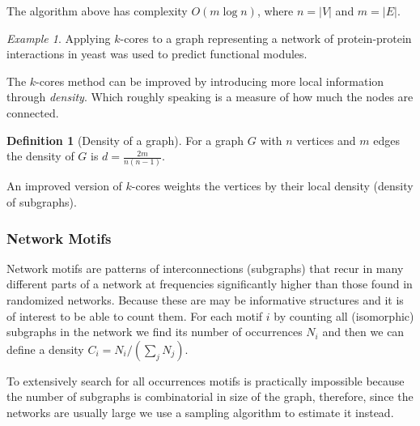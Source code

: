 \documentclass[a4paper]{article}
\theoremstyle{plain}
\theoremstyle{definition}
\newtheorem{defn}{Definition}[section]
\theoremstyle{remark}
\newtheorem*{example}{Example}
\begin{document}
The algorithm above has complexity $O(m \log n)$, where $n = |V|$ and $m =
|E|$.

\begin{example}
  Applying $k$-cores to a graph representing a network of protein-protein
  interactions in yeast was used to predict functional modules.
\end{example}

The $k$-cores method can be improved by introducing more local information
through \emph{density}. Which roughly speaking is a measure of how much the
nodes are connected.

\begin{defn}[Density of a graph]
  For a graph $G$ with $n$ vertices and $m$ edges the density of $G$ is $d =
  \frac{2m}{n(n-1)}$.
\end{defn}

An improved version of $k$-cores weights the vertices by their local density
(density of subgraphs).

\subsubsection{Network Motifs}

Network motifs are patterns of interconnections (subgraphs) that recur in many
different parts of a network at frequencies significantly higher than those
found in randomized networks. Because these are may be informative structures
and it is of interest to be able to count them. For each motif $i$ by counting
all (isomorphic) subgraphs in the network we find its number of occurrences
$N_i$ and then we can define a density $C_i = N_i / (\sum_j N_j)$.

To extensively search for all occurrences motifs is practically impossible
because the number of subgraphs is combinatorial in size of the graph,
therefore, since the networks are usually large we use a sampling algorithm to
estimate it instead.
\end{document}
